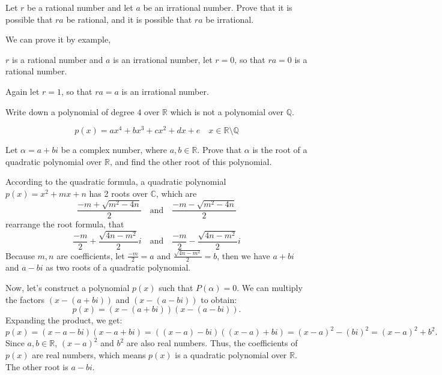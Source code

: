 
\begin{exercise}
Let $r$ be a rational number and let $a$ be an irrational number. Prove that it is possible that $ra$ be rational, and it is possible that $ra$ be irrational.
\end{exercise}

\begin{solution}
We can prove it by example,

$r$ is a rational number and $a$ is an irrational number, let $r = 0$, so that $ra=0$ is a rational number. 

Again let $r = 1$, so that $ra=a$ is an irrational number.
\end{solution}


\begin{exercise}
Write down a polynomial of degree $4$ over $\mathbb{R}$ which is not a polynomial over $\mathbb{Q}$.
\end{exercise}

\begin{solution}
\[p(x) = ax^4+bx^3+cx^2+dx+e \quad x \in \mathbb{R} \setminus \mathbb{Q}\]
\end{solution}


\begin{exercise}
\label{exComplexNumberAsRootOfQuadraticOverR}
Let $\alpha = a+bi$ be a complex number, where $a,b \in \mathbb{R}$. Prove that $\alpha$ is the root of a quadratic polynomial over $\mathbb{R}$, and find the other root of this polynomial.
\end{exercise}

\begin{solution}
According to the quadratic formula, a quadratic polynomial $p(x) = x^2+mx+n$ has 2 roots over $\mathbb{C}$, which are
\[ \frac{-m+\sqrt{m^2-4n}}{2} \quad \text{and} \quad \frac{-m-\sqrt{m^2-4n}}{2} \]
rearrange the root formula, that
\[ \frac{-m}{2}+\frac{\sqrt{4n-m^2}}{2}i \quad \text{and} \quad \frac{-m}{2}-\frac{\sqrt{4n-m^2}}{2}i \]
Because $m,n$ are coefficients, let $\frac{-m}{2} = a$ and $\frac{\sqrt{4n-m^2}}{2} = b$, then we have $a+bi$ and $a-bi$ as two roots of a quadratic polynomial.

Now, let’s construct a polynomial $p(x)$ such that $P(\alpha) = 0$. We can multiply the factors $(x - (a+bi))$ and $(x - (a-bi))$ to obtain:
\[p(x) = (x - (a + bi))(x - (a - bi)).\]
Expanding the product, we get:
\[p(x) = (x - a - bi)(x - a + bi) = ((x - a) - bi)((x - a) + bi) = (x - a)^2 - (bi)^2=(x-a)^2+b^2.\]
Since $a,b \in \mathbb{R}$, $(x - a)^2$ and $b^2$ are also real numbers. Thus, the coefficients of $p(x)$ are real numbers, which means $p(x)$ is a quadratic polynomial over $\mathbb{R}$. The other root is $a-bi$.
\end{solution}

